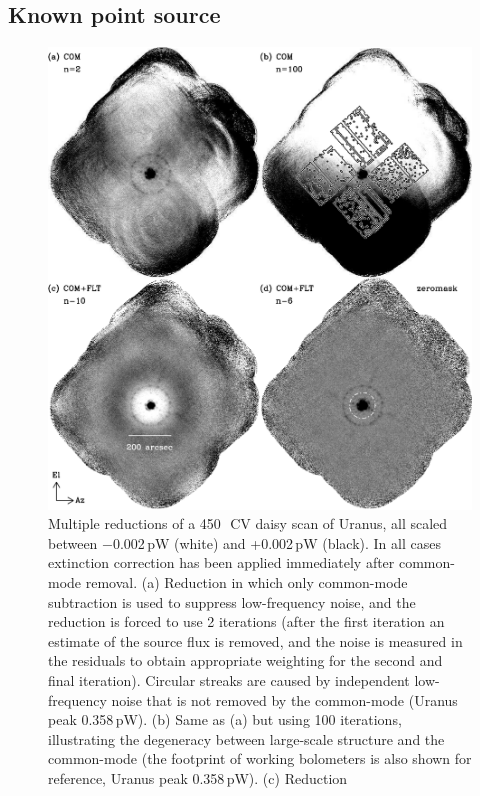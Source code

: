 \documentclass[useAMS,usenatbib,nofootinbib]{mn2e}
\begin{document}
\subsection{Known point source}
\label{sec:point}

\begin{figure}
\centering
\includegraphics[width=\linewidth]{pointmaps}
\caption{Multiple reductions of a 450\,\micron\ CV daisy scan of
  Uranus, all scaled between $-$0.002\,pW (white) and +0.002\,pW
  (black). In all cases extinction correction has been applied
  immediately after common-mode removal. (a) Reduction in which only
  common-mode subtraction is used to suppress low-frequency noise, and
  the reduction is forced to use 2 iterations (after the first
  iteration an estimate of the source flux is removed, and the noise
  is measured in the residuals to obtain appropriate weighting for the
  second and final iteration). Circular streaks are caused by
  independent low-frequency noise that is not removed by the
  common-mode (Uranus peak 0.358\,pW). (b) Same as (a) but using 100
  iterations, illustrating the degeneracy between large-scale
  structure and the common-mode (the footprint of working bolometers
  is also shown for reference, Uranus peak 0.358\,pW). (c) Reduction
}
\end{figure}
\end{document}

